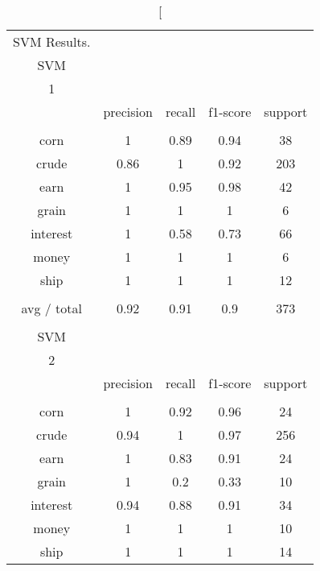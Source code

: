 \documentclass[11pt]{article}
\begin{document}
\begin{center}
\begin{longtable}{| c | c | c | c | c |}
\caption[SVM Results.} \\

SVM         &           &        &          &         \\
1           &           &        &          &         \\
           & precision & recall & f1-score & support \\
           &           &        &          &         \\
corn        & 1         & 0.89   & 0.94     & 38      \\
crude       & 0.86      & 1      & 0.92     & 203     \\
earn        & 1         & 0.95   & 0.98     & 42      \\
grain       & 1         & 1      & 1        & 6       \\
interest    & 1         & 0.58   & 0.73     & 66      \\
money       & 1         & 1      & 1        & 6       \\
ship        & 1         & 1      & 1        & 12      \\
           &           &        &          &         \\
avg / total & 0.92      & 0.91   & 0.9      & 373     \\
           &           &        &          &         \\
SVM         &           &        &          &         \\
2           &           &        &          &         \\
           & precision & recall & f1-score & support \\
           &           &        &          &         \\
corn        & 1         & 0.92   & 0.96     & 24      \\
crude       & 0.94      & 1      & 0.97     & 256     \\
earn        & 1         & 0.83   & 0.91     & 24      \\
grain       & 1         & 0.2    & 0.33     & 10      \\
interest    & 0.94      & 0.88   & 0.91     & 34      \\
money       & 1         & 1      & 1        & 10      \\
ship        & 1         & 1      & 1        & 14      \\

\end{longtable}
\end{center}
\end{document}
